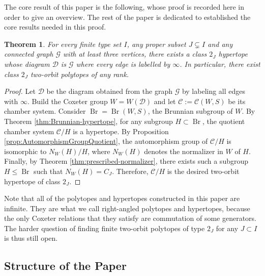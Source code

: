 \documentclass[11pt,letterpaper]{amsart}
\newtheorem{thmalpha}{Theorem}
\newcommand{\C}{\mathcal{C}}
\newcommand{\Br}{\operatorname{Br}}
\begin{document}
The core result of this paper is the following, whose proof is recorded here in order to give an overview. The rest of the paper is dedicated to established the core results needed in this proof. 

\begin{thmalpha}\label{thm:main}
    For every finite type set $I$, any proper subset $J \subsetneq I$ and any connected graph $\mathcal{G}$ with at least three vertices, there exists a class $2_J$ hypertope whose diagram $\mathcal{D}$ is $\mathcal{G}$ where every edge is labelled by $\infty$. In particular, there exist class $2_J$ two-orbit polytopes of any rank.
\end{thmalpha}

\begin{proof}
    Let $\mathcal{D}$ be the diagram obtained from the graph $\mathcal{G}$ by labeling all edges with $\infty$. Build the Coxeter group $W = W(\mathcal{D})$ and let $\C := \mathcal{C}(W,S)$ be its chamber system. Consider $\Br = \Br(W,S)$, the Brunnian subgroup of $W$. By Theorem \ref{thm:Brunnian-hypertope}, for any subgroup $H \subset \Br$, the quotient chamber system $\C/H$ is a hypertope. By Proposition \ref{prop:AutomorphismGroupQuotient}, the automorphism group of $\C/H$ is isomorphic to $N_W(H)/H$, where $N_W(H)$ denotes the normalizer in $W$ of $H$. Finally, by Theorem \ref{thm:prescribed-normalizer}, there exists such a subgroup $H \leq \Br$ such that $N_W(H) = C_J$. Therefore, $\mathcal{C}/H$ is the desired two-orbit hypertope of class $2_J$.
\end{proof}


Note that all of the polytopes and hypertopes constructed in this paper are infinite. They are what we call right-angled polytopes and hypertopes, because the only Coxeter relations that they satisfy are commutation of some generators. The harder question of finding finite two-orbit polytopes of type $2_J$ for any $J \subset I$ is thus still open.

\subsection{Structure of the Paper}
\end{document}
